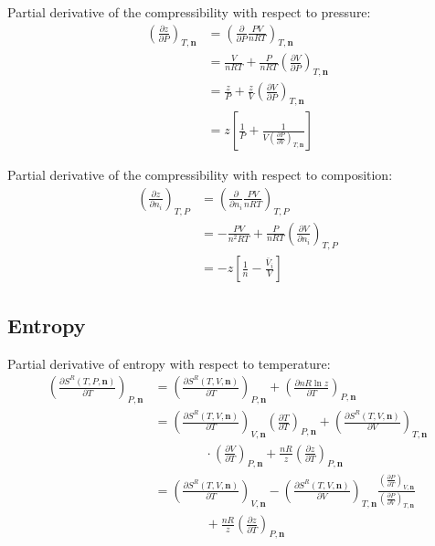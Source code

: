 \documentclass[internal,english]{sintefmemo2012}
\numberwithin{equation}{section}
\newcommand*{\pder}[2]{\left(\frac{\partial #1}{\partial #2}\right)}
\begin{document}
Partial derivative of the compressibility with respect to pressure:
\begin{equation}
\begin{split}
\left( \frac{\partial z}{\partial P} \right)_{T, \textbf{n}}
& = \left( \frac{\partial }{\partial P} \frac{PV}{nRT} \right)_{T, \textbf{n}} \\
& = \frac{V}{nRT} + \frac{P}{nRT} \left( \frac{\partial V}{\partial P} \right)_{T, \textbf{n}} \\
& = \frac{z}{P} + \frac{z}{V} \left( \frac{\partial V}{\partial P} \right)_{T, \textbf{n}} \\
& = z \left[ \frac{1}{P} + \frac{1}{V \pder{P}{V}_{T,\textbf{n}}} \right]
\end{split}
\end{equation}

Partial derivative of the compressibility with respect to composition:
\begin{equation}
\begin{split}
\left( \frac{\partial z}{\partial n_i} \right)_{T,P}
& = \left( \frac{\partial }{\partial n_i} \frac{PV}{nRT} \right)_{T,P} \\
& = - \frac{PV}{n^2RT} + \frac{P}{nRT} \left( \frac{\partial V}{\partial n_i} \right)_{T,P} \\
& = - z \left[ \frac{1}{n} - \frac{\bar{V}_i}{V}  \right]
\end{split}
\end{equation}

\subsection{Entropy}

Partial derivative of entropy with respect to temperature:
\begin{equation}
\begin{split}
\left( \frac{\partial S^R(T,P,\textbf{n})}{\partial T} \right)_{P,\textbf{n}}
& = \left( \frac{\partial S^R(T,V, \textbf{n})}{\partial T} \right)_{P,\textbf{n}} + \left( \frac{\partial nR \ln z}{\partial T} \right)_{P,\textbf{n}} \\
& = \pder{S^R(T,V,\textbf{n})}{T}_{V,\textbf{n}} \pder{T}{T}_{P,\textbf{n}} + \pder{S^R(T,V,\textbf{n})}{V}_{T,\textbf{n}} \\
& \qquad \qquad \cdot \pder{V}{T}_{P,\textbf{n}} + \frac{nR}{z} \pder{z}{T}_{P,\textbf{n}} \\
& = \pder{S^R(T,V,\textbf{n})}{T}_{V,\textbf{n}} - \pder{S^R(T,V,\textbf{n})}{V}_{T,\textbf{n}} \frac{\pder{P}{T}_{V,\textbf{n}}}{\pder{P}{V}_{T,\textbf{n}}} \\
& \qquad \qquad + \frac{nR}{z} \pder{z}{T}_{P,\textbf{n}} 
\end{split}
\end{equation}
\end{document}
